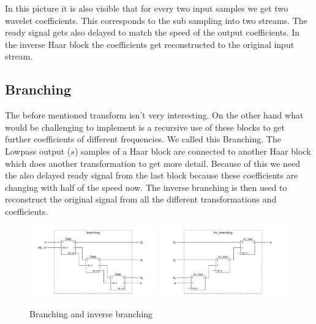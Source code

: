 \begin{refsection}

In this picture it is also visible that for every two input samples we get two wavelet coefficients. This corresponds to the sub sampling into two streams. The ready signal gets also delayed to match the speed of the output coefficients. In the inverse Haar block the coefficients get reconstructed to the original input stream.

\subsection{Branching}

The before mentioned transform isn't very interesting. On the other hand what would be challenging to implement is a recursive use of these blocks to get further coefficients of different frequencies.
We called this Branching. The Lowpass output ($s$) samples of a Haar block are connected to another Haar block which does another transformation to get more detail. Because of this we need the also delayed ready signal from the last block because these coefficients are changing with half of the speed now. 
The inverse branching  is then used to reconstruct the original signal from all the different transformations and coefficients.
\begin{figure}
	\includegraphics[width=0.49\textwidth]{images/branching.pdf}
	\includegraphics[width=0.49\textwidth]{images/inv_branching.pdf}
	\caption{Branching and inverse branching \label{fpga:branching}}
\end{figure}




\end{refsection}
